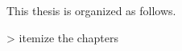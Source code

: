 \begin{Introduction}


\newpage
This thesis is organized as follows.

> itemize the chapters
\end{Introduction}

